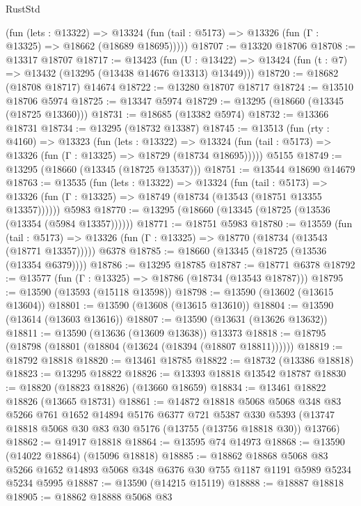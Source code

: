 \begin{lexlean}{RustStd}
\begin{coremodule}
      (fun (lets : @13322) =>
      @13324 (fun (tail : @5173) => @13326 (fun (Γ : @13325) => @18662 (@18689 @18695)))))
@18707 := @13320 @18706
@18708 := @13317 @18707
@18717 := @13423
    (fun (U : @13422) => @13424 (fun (t : @7) => @13432 (@13295 (@13438 @14676 @13313) @13449)))
@18720 := @18682 (@18708 @18717) @14674
@18722 := @13280 @18707 @18717
@18724 := @13510 @18706 @5974
@18725 := @13347 @5974
@18729 := @13295 (@18660 (@13345 (@18725 @13360)))
@18731 := @18685 (@13382 @5974)
@18732 := @13366 @18731
@18734 := @13295 (@18732 @13387)
@18745 := @13513
    (fun (rty : @4160) =>
    @13323
      (fun (lets : @13322) =>
      @13324 (fun (tail : @5173) => @13326 (fun (Γ : @13325) => @18729 (@18734 @18695)))))
    @5155
@18749 := @13295 (@18660 (@13345 (@18725 @13537)))
@18751 := @13544 @18690 @14679
@18763 := @13535
    (fun (lets : @13322) =>
    @13324
      (fun (tail : @5173) =>
      @13326 (fun (Γ : @13325) => @18749 (@18734 (@13543 (@18751 @13355 @13357))))))
    @5983
@18770 := @13295 (@18660 (@13345 (@18725 (@13536 (@13354 (@5984 @13357))))))
@18771 := @18751 @5983
@18780 := @13559
    (fun (tail : @5173) => @13326 (fun (Γ : @13325) => @18770 (@18734 (@13543 (@18771 @13357)))))
    @6378
@18785 := @18660 (@13345 (@18725 (@13536 (@13354 @6379))))
@18786 := @13295 @18785
@18787 := @18771 @6378
@18792 := @13577 (fun (Γ : @13325) => @18786 (@18734 (@13543 @18787)))
@18795 := @13590 (@13593 (@15118 @13598))
@18798 := @13590 (@13602 (@13615 @13604))
@18801 := @13590 (@13608 (@13615 @13610))
@18804 := @13590 (@13614 (@13603 @13616))
@18807 := @13590 (@13631 (@13626 @13632))
@18811 := @13590 (@13636 (@13609 @13638)) @13373
@18818 := @18795 (@18798 (@18801 (@18804 (@13624 (@18394 (@18807 @18811))))))
@18819 := @18792 @18818
@18820 := @13461 @18785
@18822 := @18732 (@13386 @18818)
@18823 := @13295 @18822
@18826 := @13393 @18818 @13542 @18787
@18830 := @18820 (@18823 @18826) (@13660 @18659)
@18834 := @13461 @18822 @18826 (@13665 @18731)
@18861 := @14872
    @18818
    @5068
    @5068
    @348
    @83
    @5266
    @761
    @1652
    @14894
    @5176
    @6377
    @721
    @5387
    @330
    @5393
    (@13747 @18818 @5068 @30 @83 @30 @5176 (@13755 (@13756 @18818 @30)) @13766)
@18862 := @14917 @18818
@18864 := @13595 @74 @14973
@18868 := @13590 (@14022 @18864) (@15096 @18818)
@18885 := @18862
    @18868
    @5068
    @83
    @5266
    @1652
    @14893
    @5068
    @348
    @6376
    @30
    @755
    @1187
    @1191
    @5989
    @5234
    @5234
    @5995
@18887 := @13590 (@14215 @15119)
@18888 := @18887 @18818
@18905 := @18862
    @18888
    @5068
    @83

\end{coremodule}
\end{lexlean}

